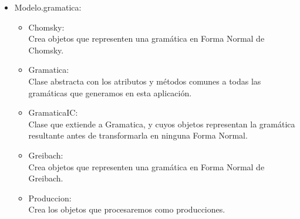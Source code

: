 \documentclass[12pt,a4paper,spanish]{book}
\begin{document}
\begin{itemize}
\item Modelo.gramatica:\\
\begin{itemize}
\item Chomsky:\\Crea objetos que representen una gram\'atica en Forma Normal de Chomsky.
\item Gramatica:\\Clase abstracta con los atributos y m\'etodos comunes a todas las gram\'aticas que generamos en esta aplicaci\'on.
\item GramaticaIC:\\Clase que extiende a Gramatica, y cuyos objetos representan la gram\'atica resultante antes de transformarla en ninguna Forma Normal.
\item Greibach:\\Crea objetos que representen una gram\'atica en Forma Normal de Greibach.
\item Produccion:\\Crea los objetos que procesaremos como producciones.
\end{itemize}
\end{itemize}

\newpage
\end{document}
